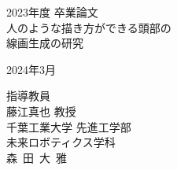 \documentclass[12pt,titlepage,a4j,oneside]{myjbook2}
\begin{document}
  \begin{titlepage}
    \begin{center}
      \vspace*{1cm}
      \LARGE 2023年度 卒業論文 \\
      \vspace*{1cm}
      \Huge 人のような描き方ができる頭部の \\
      線画生成の研究 \\
      \vspace*{45mm}

      {\LARGE %
      2024年3月}
      \vspace*{10mm}
      
      {\Large
      指導教員 \\
      藤江真也 教授} \\
      \vspace*{20mm}
      \LARGE
      千葉工業大学 先進工学部 \\
      未来ロボティクス学科 \\
      \vspace*{10mm}
      {\Huge 森~田~大~雅}
    \end{center}
  \end{titlepage}

  \frontmatter
  \baselineskip=21pt
  \tableofcontents
  \listoffigures
  \listoftables

  \setlength{\abovedisplayskip}{25pt plus0pt minus0pt}
  \setlength{\belowdisplayskip}{25pt plus0pt minus0pt}

  \mainmatter
  

  

  

  

  

  

  \backmatter
  

  

  \mainmatter
  \addtocounter{page}{2}
  \appendix
  
\end{document}
